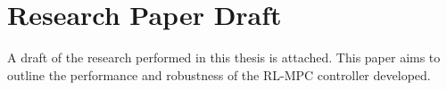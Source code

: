 \chapter{Research Paper Draft}
\label{chapter:paper}
A draft of the research performed in this thesis is attached. This paper aims to outline the performance and robustness of the RL-MPC controller developed.

